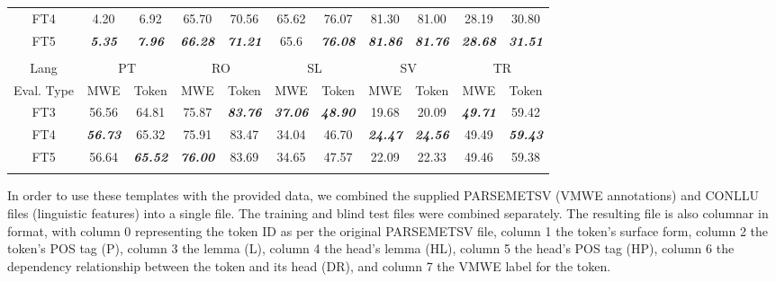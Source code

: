 \documentclass[output=paper,modfonts,nonflat]{langsci/langscibook}
\begin{document}
\begin{table}
{\begin{tabular}{ccccccccccc}
{\tiny{}FT4 } & {\tiny{}4.20 } & {\tiny{}6.92 } & {\tiny{}65.70 } & {\tiny{}70.56 }& {\tiny{}65.62 } & {\tiny{}76.07 } & {\tiny{}81.30 } & {\tiny{}81.00 } & \multicolumn{1}{c}{{\tiny{}28.19}} & \multicolumn{1}{c}{{\tiny{}30.80}}\tabularnewline
 
{\tiny{}FT5 } & \textbf{\emph{\tiny{}5.35}}\emph{\tiny{} } & \textbf{\emph{\tiny{}7.96}}\emph{\tiny{} } & \textbf{\emph{\tiny{}66.28}}\emph{\tiny{} } & \textbf{\emph{\tiny{}71.21}}\emph{\tiny{} }& {\tiny{}65.6 } & \textbf{\emph{\tiny{}76.08 }} & \textbf{\emph{\tiny{}81.86}}\emph{\tiny{} } & \textbf{\emph{\tiny{}81.76}}\emph{\tiny{} } & \multicolumn{1}{c}{\textbf{\emph{\tiny{}28.68}}} & \multicolumn{1}{c}{\textbf{\emph{\tiny{}31.51}}}\tabularnewline
 
\lspbottomrule
 & &&&&&&&&&  \tabularnewline
\lsptoprule
{\tiny{}Lang }& \multicolumn{2}{c}{{\tiny{}PT}} & \multicolumn{2}{c}{{\tiny{}RO}} & \multicolumn{2}{c}{{\tiny{}SL}} & \multicolumn{2}{c}{{\tiny{}SV}} & \multicolumn{2}{c}{{\tiny{}TR}}  \tabularnewline
{\tiny{}Eval. Type } & {\tiny{}MWE } & {\tiny{}Token } & {\tiny{}MWE } & {\tiny{}Token } & {\tiny{}MWE } & {\tiny{}Token } & {\tiny{}MWE } & {\tiny{}Token } & {\tiny{}MWE } & {\tiny{}Token }   \tabularnewline
\midrule
{\tiny{}FT3 } & {\tiny{}56.56 } & {\tiny{}64.81 } & {\tiny{}75.87 } & \textbf{\emph{\tiny{}83.76}}\emph{\tiny{} } & \textbf{\emph{\tiny{}37.06}}\emph{\tiny{} } & \textbf{\emph{\tiny{}48.90}}\emph{\tiny{} } & {\tiny{}19.68 } & {\tiny{}20.09 } & \textbf{\emph{\tiny{}49.71}}\emph{\tiny{} } & {\tiny{}59.42 }    \tabularnewline
{\tiny{}FT4 }  & \textbf{\emph{\tiny{}56.73}}\emph{\tiny{} } & {\tiny{}65.32 } & {\tiny{}75.91 } & {\tiny{}83.47 } & {\tiny{}34.04 } & {\tiny{}46.70 } & \textbf{\emph{\tiny{}24.47}}\emph{\tiny{} } & \textbf{\emph{\tiny{}24.56}}\emph{\tiny{} } & {\tiny{}49.49 } & \textbf{\emph{\tiny{}59.43}}{\tiny{} }   \tabularnewline
{\tiny{}FT5 }  & {\tiny{}56.64 } & \textbf{\emph{\tiny{}65.52}}{\tiny{} } & \textbf{\emph{\tiny{}76.00}}\emph{\tiny{} } & {\tiny{}83.69 } & {\tiny{}34.65 } & {\tiny{}47.57 } & {\tiny{}22.09 } & {\tiny{}22.33 } & {\tiny{}49.46 } & {\tiny{}59.38 }    \tabularnewline
\lspbottomrule
\end{tabular}
}
\end{table}

In order to use these templates with the provided data, we combined
the supplied PARSEMETSV (VMWE annotations) and CONLLU files
(linguistic features) into a single file. The training and blind test
files were combined separately. The resulting file is also columnar in
format, with column 0 representing the token ID as per the original
PARSEMETSV file, column 1 the token's surface form, column 2 the
token's POS tag (P), column 3 the lemma (L), column 4 the head's
lemma (HL), column 5 the head's POS tag (HP), column 6 the
dependency relationship between the token and its head (DR), and column 7
the VMWE label for the token. 
\end{document}
